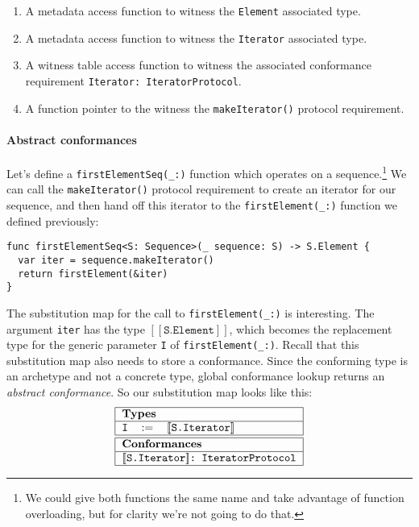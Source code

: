 \documentclass[a4paper,headsepline,bibliography=totoc,toc=flat,fleqn,twoside=semi]{scrbook}
\theoremstyle{definition}
\theoremstyle{definition}
\theoremstyle{definition}
\newcommand{\SubMapC}[2]{\begin{tabular}{|lll|}
\hline
\multicolumn{3}{|l|}{\textbf{Types}}\\
\hline
#1\\
\hline
\hline
\multicolumn{3}{|l|}{\textbf{Conformances}}\\
\hline
#2\\
\hline
\end{tabular}}
\newcommand{\SubType}[2]{\texttt{#1}&$:=$&\texttt{#2}}
\newcommand{\SubConf}[1]{\multicolumn{3}{|l|}{\texttt{#1}}}
\newcommand{\archetype}[1]{$[\![\texttt{#1}]\!]$}
\begin{document}
\begin{enumerate}
\item A metadata access function to witness the \texttt{Element} associated type.
\item A metadata access function to witness the \texttt{Iterator} associated type.
\item A witness table access function to witness the associated conformance requirement \verb|Iterator: IteratorProtocol|.
\item A function pointer to the witness the \texttt{makeIterator()} protocol requirement.
\end{enumerate}

\paragraph{Abstract conformances}
Let's define a \verb|firstElementSeq(_:)| function which operates on a sequence.\footnote{We could give both functions the same name and take advantage of function overloading, but for clarity we're not going to do that.} We can call the \verb|makeIterator()| protocol requirement to create an iterator for our sequence, and then hand off this iterator to the \verb|firstElement(_:)| function we defined previously:
\begin{Verbatim}
func firstElementSeq<S: Sequence>(_ sequence: S) -> S.Element {
  var iter = sequence.makeIterator()
  return firstElement(&iter)
}
\end{Verbatim}
The substitution map for the call to \verb|firstElement(_:)| is interesting. The argument \texttt{iter} has the type \archetype{S.Element}, which becomes the replacement type for the generic parameter \texttt{I} of \verb|firstElement(_:)|. Recall that this substitution map also needs to store a conformance. Since the conforming type is an archetype and not a concrete type, global conformance lookup returns an \emph{abstract conformance}. So our substitution map looks like this:
\[\SubMapC{\SubType{I}{\archetype{S.Iterator}}}{\SubConf{\archetype{S.Iterator}:\ IteratorProtocol}}\]
\end{document}
